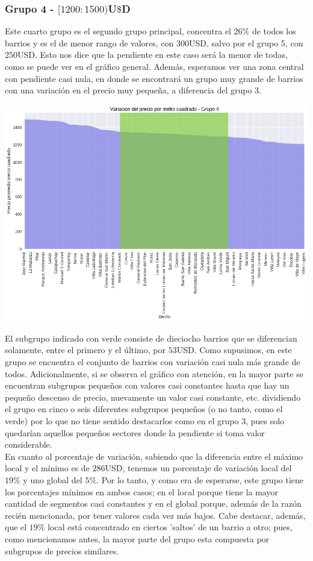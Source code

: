 \documentclass[a4paper, 10pt]{article}
\newcommand\tab[1][0.5cm]{\hspace*{#1}}
\begin{document}
				\subsubsection{Grupo 4 - $[1200:1500)$U$\$$D}
					Este cuarto grupo es el segundo grupo principal, concentra el $26\%$ de todos los barrios y es el de menor
					rango de valores, con $300$USD, salvo por el grupo 5, con $250$USD. Esto nos dice que la pendiente en este
					caso será la menor de todas, como se puede ver en el gráfico general. Además, esperamos ver una zona central
					con pendiente casi nula, en donde se encontrará un grupo muy grande de barrios con una variación en el precio
					muy pequeña, a diferencia del grupo 3.
					\begin{center}
   		    				\includegraphics[width=\textwidth]{images/m2Group4Area}
				  	\end{center}
				  	\tab El subgrupo indicado con verde consiste de dieciocho barrios que se diferencian solamente, entre el primero
				  	y el último, por $53$USD. Como supusimos, en este grupo se encuentra el conjunto de barrios con variación casi
				  	nula más grande de todos. Adicionalmente, si se observa el gráfico con atención, en la mayor parte se encuentran
				  	subgrupos pequeños con valores casi constantes hasta que hay un pequeño descenso de precio, nuevamente un valor
				  	casi constante, etc. dividiendo el grupo en cinco o seis diferentes subgrupos pequeños (o no tanto, como el
				  	verde) por lo que no tiene sentido destacarlos como en el grupo 3, pues solo quedarían aquellos pequeños sectores
				  	donde la pendiente si toma valor considerable. \\
				  	\tab En cuanto al porcentaje de variación, sabiendo que la diferencia entre el máximo local y el mínimo es de
				  	$286$USD, tenemos un porcentaje de variación local del $19\%$ y uno global del $5\%$. Por lo tanto, y como era
				  	de esperarse, este grupo tiene los porcentajes mínimos en ambos casos; en el local porque tiene la mayor cantidad
				  	de segmentos casi constantes y en el global porque, además de la razón recién mencionada, por tener valores
				  	cada vez más bajos. Cabe destacar, además, que el $19\%$ local está concentrado en ciertos 'saltos' de un
				  	barrio a otro; pues, como mencionamos antes, la mayor parte del grupo esta compuesta por subgrupos de precios
				  	similares.
\end{document}
